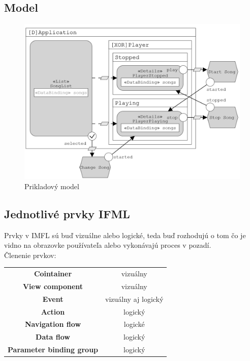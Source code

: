 \documentclass[12pt,slovak,a4paper]{article}
\begin{document}
\subsection{Model}

\begin{figure}[h]
	\includegraphics[scale=0.585]{model.pdf}
	\caption{Prikladový model\cite{IFML:Edit}}		
\end{figure}


\subsection{Jednotlivé prvky IFML}

Prvky v IMFL sú buď vizuálne alebo logické, teda buď rozhodujú o tom čo je vidno na obrazovke používateľa alebo vykonávajú proces v pozadí.\\

Členenie prvkov:

\begin{center}

	\begin{tabular}{c c}

		\textbf{Cointainer} & vizuálny\\
		\textbf{View component} & vizuálny\\
		\textbf{Event} & vizuálny aj logický\\
		\textbf{Action} & logický\\
		\textbf{Navigation flow} & logické\\
		\textbf{Data flow} & logický\\
		\textbf{Parameter binding group} & logický\\

	\end{tabular}

\end{center}
\end{document}
